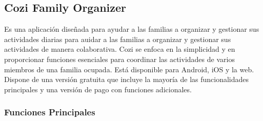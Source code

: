 \subsection{Cozi Family Organizer}
\label{sec:cozi}
Es una aplicación diseñada para ayudar a las familias a organizar y gestionar sus actividades diarias para auidar a las familias a organizar y 
gestionar sus actividades de manera colaborativa. Cozi se enfoca en la simplicidad y en proporcionar funciones esenciales para coordinar 
las actividades de varios miembros de una familia ocupada. Está disponible para Android, iOS y la web. Dispone de una versión 
gratuita que incluye la mayoría de las funcionalidades principales y una versión de pago con funciones adicionales.

\subsubsection{Funciones Principales}
\label{subsec:funciones_cozi}

